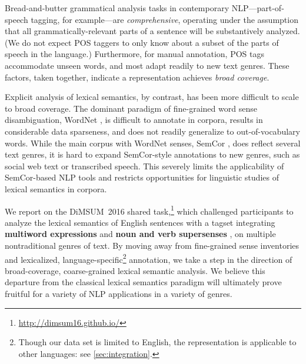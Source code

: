 \documentclass[11pt,letterpaper]{article}
\newcommand{\ensuretext}[1]{#1}
\newcommand{\nssmarker}{\ensuretext{\textcolor{magenta}{\ensuremath{^{\textsc{NS}}_{\textsc{S}}}}}}
\newcommand{\arkcomment}[3]{\ensuretext{\textcolor{#3}{[#1 #2]}}}
\newcommand{\nss}[1]{\arkcomment{\nssmarker}{#1}{magenta}}
\newcommand{\finalversion}[1]{}
\begin{document}
Bread-and-butter grammatical analysis tasks in contemporary NLP---part-of-speech tagging, for example---are \emph{comprehensive}, 
operating under the assumption that all grammatically-relevant parts of a sentence  
will be substantively analyzed. (We do not expect POS taggers to only know about a subset of the parts of speech in the language.) 
Furthermore, for manual annotation, 
POS tags accommodate unseen words, and most adapt readily to new text genres.
These factors, taken together, indicate a representation achieves \emph{broad coverage}. 

Explicit analysis of lexical semantics, by contrast, has been more difficult to scale 
to broad coverage.
The dominant paradigm of fine-grained word sense disambiguation, WordNet \citep{wordnet}, 
is difficult to annotate in corpora, results in considerable data sparseness, 
and does not readily generalize to out-of-vocabulary words.
While the main corpus with WordNet senses, 
SemCor \citep{semcor}, does reflect several text genres, it is hard
to expand SemCor-style annotations to new genres, such as social web text 
or transcribed speech.
This severely limits the applicability of SemCor-based NLP tools 
and restricts opportunities for linguistic studies of lexical semantics in corpora.

\finalversion{\nss{do we want to say something about insights from MT? this needs work:}
Consequently,  \citet{carpuat-05,resnik-06} found that traditional, fine-grained word sense disambiguation 
did indeed \emph{not} improve machine translation. 
\nss{TODO}However, abstracting the senses and moving to multi-word does \citep{chan-07,carpuat-07,lefever-10}.
}


We report on the DiMSUM~2016 shared task,\footnote{\url{http://dimsum16.github.io/}} which challenged participants to analyze the lexical semantics 
of English sentences with a tagset integrating
\textbf{multiword expressions} and \textbf{noun and verb supersenses} \citep[following][]{schneider-15}, 
on multiple nontraditional genres of text. 
By moving away from fine-grained sense inventories and lexicalized, language-specific\footnote{Though our data set is limited to English, the representation is applicable to other languages: see \cref{sec:integration}.} annotation,
we take a step in the direction of broad-coverage, coarse-grained lexical semantic analysis. 
We believe this departure from the classical lexical semantics paradigm 
will ultimately prove fruitful for a variety of NLP applications in a variety of genres. 
\end{document}
